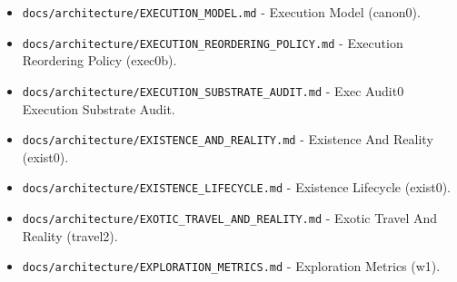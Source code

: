 \documentclass[9pt,a4paper,openany]{book}
\begin{document}
\begin{itemize}
\item \texttt{docs/\allowbreak{}architecture/\allowbreak{}EXECUTION\_\allowbreak{}MODEL.\allowbreak{}md} -\allowbreak{} Execution Model (canon0).\allowbreak{}
\end{itemize}

\begin{itemize}
\item \texttt{docs/\allowbreak{}architecture/\allowbreak{}EXECUTION\_\allowbreak{}REORDERING\_\allowbreak{}POLICY.\allowbreak{}md} -\allowbreak{} Execution Reordering Policy (exec0b).\allowbreak{}
\end{itemize}

\begin{itemize}
\item \texttt{docs/\allowbreak{}architecture/\allowbreak{}EXECUTION\_\allowbreak{}SUBSTRATE\_\allowbreak{}AUDIT.\allowbreak{}md} -\allowbreak{} Exec Audit0 Execution Substrate Audit.\allowbreak{}
\end{itemize}

\begin{itemize}
\item \texttt{docs/\allowbreak{}architecture/\allowbreak{}EXISTENCE\_\allowbreak{}AND\_\allowbreak{}REALITY.\allowbreak{}md} -\allowbreak{} Existence And Reality (exist0).\allowbreak{}
\end{itemize}

\begin{itemize}
\item \texttt{docs/\allowbreak{}architecture/\allowbreak{}EXISTENCE\_\allowbreak{}LIFECYCLE.\allowbreak{}md} -\allowbreak{} Existence Lifecycle (exist0).\allowbreak{}
\end{itemize}

\begin{itemize}
\item \texttt{docs/\allowbreak{}architecture/\allowbreak{}EXOTIC\_\allowbreak{}TRAVEL\_\allowbreak{}AND\_\allowbreak{}REALITY.\allowbreak{}md} -\allowbreak{} Exotic Travel And Reality (travel2).\allowbreak{}
\end{itemize}

\begin{itemize}
\item \texttt{docs/\allowbreak{}architecture/\allowbreak{}EXPLORATION\_\allowbreak{}METRICS.\allowbreak{}md} -\allowbreak{} Exploration Metrics (w1).\allowbreak{}
\end{itemize}
\end{document}
